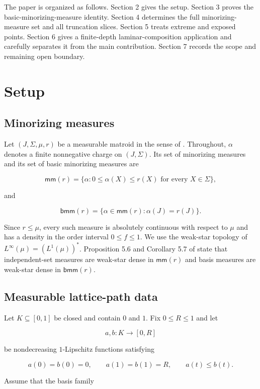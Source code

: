 \documentclass[11pt]{article}
\numberwithin{equation}{section}
\begin{document}
The paper is organized as follows. Section 2 gives the setup. Section 3 proves the
basic-minorizing-measure identity. Section 4 determines the full minorizing-measure set
and all truncation slices. Section 5 treats extreme and exposed points. Section 6 gives
a finite-depth laminar-composition application and carefully separates it from the main
contribution. Section 7 records the scope and remaining open boundary.

\section{Setup}


\subsection{Minorizing measures}


Let $(J,\Sigma,\mu,r)$ be a measurable matroid in the sense of \cite{berczi2026}. Throughout,
$\alpha$ denotes a finite nonnegative charge on $(J,\Sigma)$. Its set of minorizing
measures and its set of basic minorizing measures are

\nopagebreak[4]
\[
\mathsf{mm}(r)
=\{\alpha:0\le \alpha(X)\le r(X)\text{ for every }X\in\Sigma\},
\]

and

\nopagebreak[4]
\[
\mathsf{bmm}(r)
=\{\alpha\in\mathsf{mm}(r):\alpha(J)=r(J)\}.
\]

Since $r\le\mu$, every such measure is absolutely continuous with respect to $\mu$ and
has a density in the order interval $0\le f\le1$. We use the weak-star topology of
$L^\infty(\mu)=(L^1(\mu))^*$. Proposition 5.6 and Corollary 5.7 of \cite{berczi2026} state that
independent-set measures are weak-star dense in $\mathsf{mm}(r)$ and basis measures are
weak-star dense in $\mathsf{bmm}(r)$.

\subsection{Measurable lattice-path data}


Let $K\subseteq[0,1]$ be closed and contain $0$ and $1$. Fix $0\le R\le1$ and let

\nopagebreak[4]
\[
a,b:K\longrightarrow[0,R]
\]

be nondecreasing $1$-Lipschitz functions satisfying

\nopagebreak[4]
\[
a(0)=b(0)=0,\qquad a(1)=b(1)=R,\qquad a(t)\le b(t).
\]

Assume that the basis family
\end{document}

